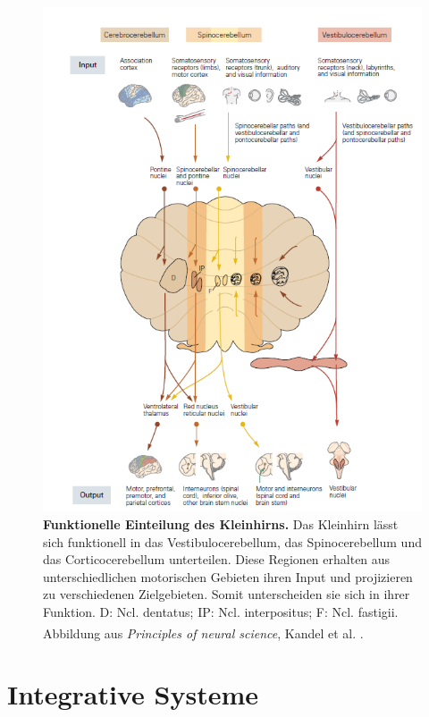 \documentclass[12pt,a4paper,pdftex]{article}
\begin{document}
\begin{figure}[H]
    \centering
    \includegraphics[width=\textwidth]{pictures/Bilder_Laura/funktionelle_einteilung_kleinhirn.PNG}
    \caption[Funktionelle Einteilung des Kleinhirns]{\textbf{Funktionelle Einteilung des Kleinhirns.} Das Kleinhirn lässt sich funktionell in das Vestibulocerebellum, das Spinocerebellum und das Corticocerebellum unterteilen. Diese Regionen erhalten aus unterschiedlichen motorischen Gebieten ihren Input und projizieren zu verschiedenen Zielgebieten. Somit unterscheiden sie sich in ihrer Funktion. D: Ncl. dentatus; IP: Ncl. interpositus; F: Ncl. fastigii. \\ Abbildung aus \textit{Principles of neural science}, Kandel et al. \textsuperscript{\cite[42]{kandel2013principles}}.}
    \label{fig:funktion_kleinhirn}
\end{figure}

\newpage
\section{Integrative Systeme} \label{sec:integrative_systeme}
\end{document}
